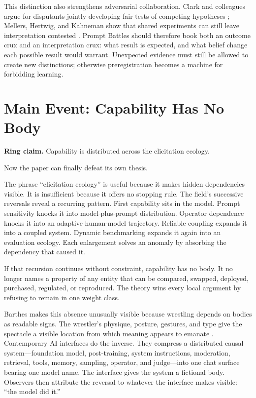 \documentclass[11pt]{article}
\newcommand{\ringclaim}[1]{\vspace{0.35em}\noindent\textbf{Ring claim.} #1\vspace{0.15em}}
\begin{document}
This distinction also strengthens adversarial collaboration. Clark and colleagues argue for disputants jointly developing fair tests of competing hypotheses \cite{clark2022enemies}; Mellers, Hertwig, and Kahneman show that shared experiments can still leave interpretation contested \cite{mellers2001frequency}. Prompt Battles should therefore book both an outcome crux and an interpretation crux: what result is expected, and what belief change each possible result would warrant. Unexpected evidence must still be allowed to create new distinctions; otherwise preregistration becomes a machine for forbidding learning.

\section{Main Event: Capability Has No Body}
\ringclaim{Capability is distributed across the elicitation ecology.}

Now the paper can finally defeat its own thesis.

The phrase ``elicitation ecology'' is useful because it makes hidden dependencies visible. It is insufficient because it offers no stopping rule. The field's successive reversals reveal a recurring pattern. First capability sits in the model. Prompt sensitivity knocks it into model-plus-prompt distribution. Operator dependence knocks it into an adaptive human-model trajectory. Reliable coupling expands it into a coupled system. Dynamic benchmarking expands it again into an evaluation ecology. Each enlargement solves an anomaly by absorbing the dependency that caused it.

If that recursion continues without constraint, capability has no body. It no longer names a property of any entity that can be compared, swapped, deployed, purchased, regulated, or reproduced. The theory wins every local argument by refusing to remain in one weight class.

Barthes makes this absence unusually visible because wrestling depends on bodies as readable signs. The wrestler's physique, posture, gestures, and type give the spectacle a visible location from which meaning appears to emanate \cite{barthes1972wrestling}. Contemporary AI interfaces do the inverse. They compress a distributed causal system---foundation model, post-training, system instructions, moderation, retrieval, tools, memory, sampling, operator, and judge---into one chat surface bearing one model name. The interface gives the system a fictional body. Observers then attribute the reversal to whatever the interface makes visible: ``the model did it.''
\end{document}
